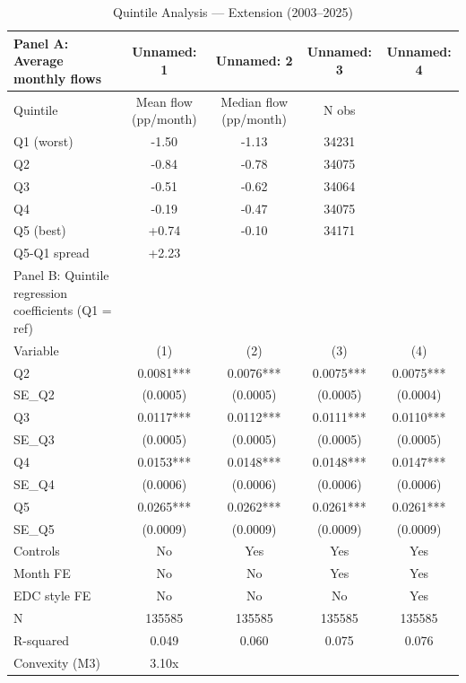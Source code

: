 \begin{table}[htbp]
\centering
\caption{Quintile Analysis --- Extension (2003--2025)}
\label{tab:quintile_extension}
\small
\begin{tabular}{lcccc}
\toprule
Panel A: Average monthly flows & Unnamed: 1 & Unnamed: 2 & Unnamed: 3 & Unnamed: 4 \\
\midrule
Quintile & Mean flow (pp/month) & Median flow (pp/month) & N obs &  \\
Q1 (worst) & -1.50 & -1.13 & 34231 &  \\
Q2 & -0.84 & -0.78 & 34075 &  \\
Q3 & -0.51 & -0.62 & 34064 &  \\
Q4 & -0.19 & -0.47 & 34075 &  \\
Q5 (best) & +0.74 & -0.10 & 34171 &  \\
Q5-Q1 spread & +2.23 &  &  &  \\
Panel B: Quintile regression coefficients (Q1 = ref) &  &  &  &  \\
Variable & (1) & (2) & (3) & (4) \\
Q2 & 0.0081*** & 0.0076*** & 0.0075*** & 0.0075*** \\
SE\_Q2 & (0.0005) & (0.0005) & (0.0005) & (0.0004) \\
Q3 & 0.0117*** & 0.0112*** & 0.0111*** & 0.0110*** \\
SE\_Q3 & (0.0005) & (0.0005) & (0.0005) & (0.0005) \\
Q4 & 0.0153*** & 0.0148*** & 0.0148*** & 0.0147*** \\
SE\_Q4 & (0.0006) & (0.0006) & (0.0006) & (0.0006) \\
Q5 & 0.0265*** & 0.0262*** & 0.0261*** & 0.0261*** \\
SE\_Q5 & (0.0009) & (0.0009) & (0.0009) & (0.0009) \\
Controls & No & Yes & Yes & Yes \\
Month FE & No & No & Yes & Yes \\
EDC style FE & No & No & No & Yes \\
N & 135585 & 135585 & 135585 & 135585 \\
R-squared & 0.049 & 0.060 & 0.075 & 0.076 \\
Convexity (M3) & 3.10x &  &  &  \\
\bottomrule
\end{tabular}
\end{table}
